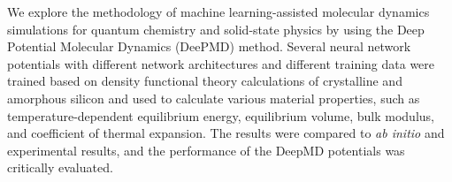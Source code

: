 We explore the methodology of machine learning-assisted molecular dynamics
simulations for quantum chemistry and solid-state physics by using the Deep
Potential Molecular Dynamics (DeePMD) method. Several neural network
potentials with different network architectures and different training data
were trained based on density functional theory calculations of crystalline
and amorphous silicon and used to calculate various material properties, such
as temperature-dependent equilibrium energy, equilibrium volume, bulk modulus,
and coefficient of thermal expansion. The results were compared to
\textit{ab initio} and experimental results, and the performance of the DeepMD
potentials was critically evaluated. 
